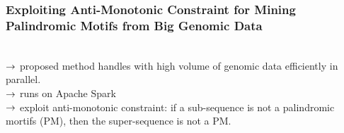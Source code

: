 
\subsubsection{Exploiting Anti-Monotonic Constraint for Mining Palindromic Motifs from Big Genomic Data}

\\

$\rightarrow$ proposed method handles with high volume of genomic data efficiently in parallel.\\

$\rightarrow$ runs on Apache Spark\\

$\rightarrow$ exploit anti-monotonic constraint: if a sub-sequence is not a palindromic mortifs (PM), then the super-sequence is not a PM.

\spacerule

